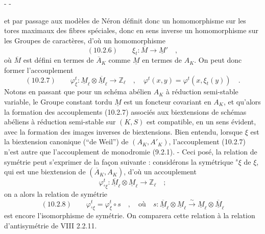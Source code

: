 \begin{center}-  -\end{center}
et par passage aux modèles de Néron définit donc un homomorphisme sur les tores maximaux des fibres spéciales, donc en sens inverse un homomorphisme sur les Groupes de caractères, d'où un homomorphisme
\[
(10.2.6)\qquad \xi_t:\overline M\longrightarrow\underline M'\quad,
\]
où $\overline M$ est défini en termes de $\overline A_K$ comme $\underline M$ en termes de $A_K$. On peut donc former l'accouplement
\[
(10.2.7)\qquad \varphi_\xi^t:\underline M_\ell\otimes\overline{\underline M}_\ell\longrightarrow\mathbb Z_\ell\quad,\quad
\varphi^t(x,y)=\varphi^t(x,\xi_t(y))\quad.
\]
Notons en passant que pour un schéma abélien $A_K$ à réduction semi-stable variable, le Groupe constant tordu $\underline M$ est un foncteur covariant en $A_K$, et qu'alors la formation des accouplements (10.2.7) associés aux biextensions de schémas abéliens à réduction semi-stable sur $(K,S)$ est compatible, en un sens évident, avec la formation des images inverses de biextensions. Bien entendu, lorsque $\xi$ est la biextension canonique (``de Weil'') de $(A_K,A'_K)$, l'accouplement (10.2.7) n'est autre que l'accouplement de monodromie (9.2.1). - Ceci posé, la relation de symétrie peut s'exprimer de la façon suivante : considérons la symétrique ${}^s\xi$ de $\xi$, qui est une biextension de $(\overline A_K,A_K)$, d'où un accouplement
\[
\varphi_{{}^s\xi}^t:\overline{\underline M}_\ell\otimes\underline M_\ell\longrightarrow\mathbb Z_\ell\quad;
\]
on a alors la relation de symétrie
\[
(10.2.8)\qquad\varphi_{{}^s\xi}^t=\varphi_\xi^t\circ s\quad,\quad
\text{où}\quad s:\overline{\underline M}_\ell\otimes\underline M_\ell\xrightarrow{\sim}\underline M_\ell\otimes\overline{\underline M}_\ell
\]
est encore l'isomorphisme de symétrie. On comparera cette relation à la relation d'antisymétrie de VIII 2.2.11.
